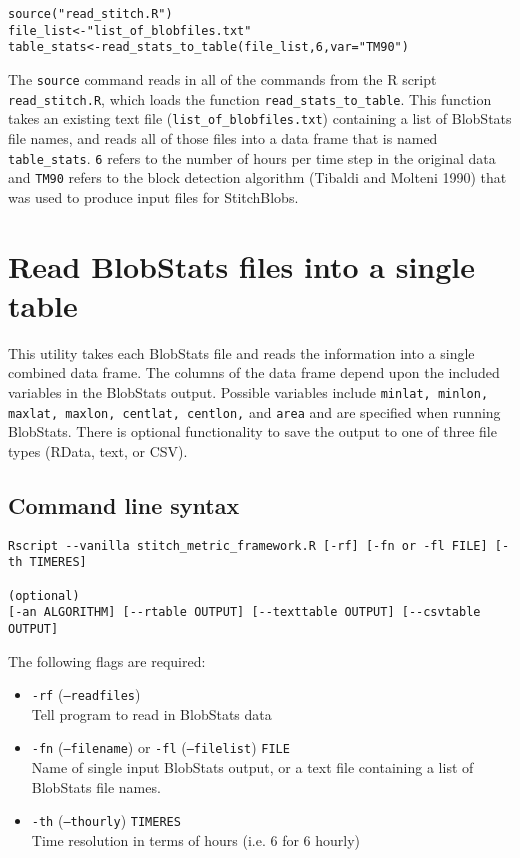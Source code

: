 \documentclass{article}
\begin{document}
\begin{verbatim}
source("read_stitch.R")
file_list<-"list_of_blobfiles.txt"
table_stats<-read_stats_to_table(file_list,6,var="TM90")
\end{verbatim}

The \texttt{source} command reads in all of the commands from the R script \texttt{read\_stitch.R}, which loads the function \texttt{read\_stats\_to\_table}. This function takes an existing text file (\texttt{list\_of\_blobfiles.txt}) containing a list of BlobStats file names, and reads all of those files into a data frame that is named \texttt{table\_stats}. \texttt{6} refers to the number of hours per time step in the original data and \texttt{TM90} refers to the block detection algorithm (Tibaldi and Molteni 1990) that was used to produce input files for StitchBlobs. 

\section{Read BlobStats files into a single table}
This utility takes each BlobStats file and reads the information into a single combined data frame. The columns of the data frame depend upon the included variables in the BlobStats output. Possible variables include \texttt{minlat, minlon, maxlat, maxlon, centlat, centlon,} and \texttt{area} and are specified when running BlobStats. There is optional functionality to save the output to one of three file types (RData, text, or CSV).

\subsection{Command line syntax}
\begin{verbatim}
Rscript --vanilla stitch_metric_framework.R [-rf] [-fn or -fl FILE] [-th TIMERES] 

(optional)
[-an ALGORITHM] [--rtable OUTPUT] [--texttable OUTPUT] [--csvtable OUTPUT]
\end{verbatim}

The following flags are required:
\begin{itemize}
\item[] \texttt{-rf} (\texttt{--readfiles}) \\ Tell program to read in BlobStats data
\item[]\texttt{-fn} (\texttt{--filename}) or \texttt{-fl} (\texttt{--filelist}) \texttt{FILE}\\ Name of single input BlobStats output, or a text file containing a list of BlobStats file names.
\item[]\texttt{-th} (\texttt{--thourly}) \texttt{TIMERES}\\ Time resolution in terms of hours (i.e. 6 for 6 hourly)
\end{itemize}
\end{document}
